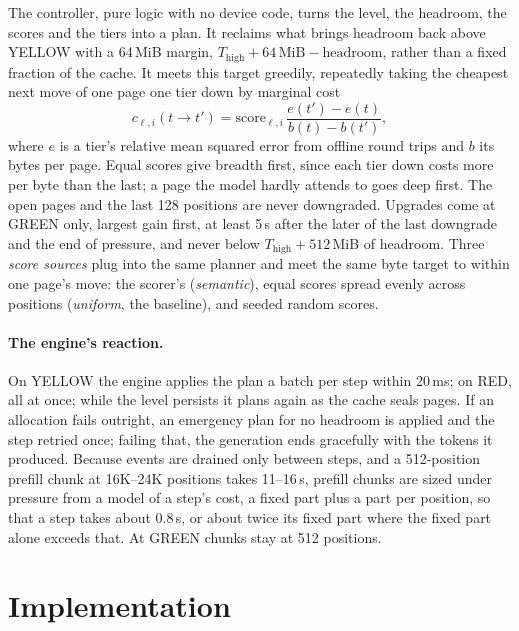 \documentclass{article}
\begin{document}
The controller, pure logic with no device code, turns the level, the headroom,
the scores and the tiers into a plan. It reclaims what brings headroom back
above YELLOW with a 64\,MiB margin, $T_\mathrm{high} + 64\,\mathrm{MiB} -
\text{headroom}$, rather than a fixed fraction of the cache. It meets this
target greedily, repeatedly taking the cheapest next move of one page one tier
down by marginal cost
\begin{equation}
  c_{\ell,i}(t \to t') = \mathrm{score}_{\ell,i}\,
    \frac{e(t') - e(t)}{b(t) - b(t')},
  \label{eq:marginal}
\end{equation}
where $e$ is a tier's relative mean squared error from offline round trips and
$b$ its bytes per page. Equal scores give breadth first, since each tier down
costs more per byte than the last; a page the model hardly attends to goes deep
first. The open pages and the last 128 positions are never downgraded.
Upgrades come at GREEN only, largest gain first, at least 5\,s after the later
of the last downgrade and the end of pressure, and never below $T_\mathrm{high}
+ 512$\,MiB of headroom. Three \textit{score sources} plug into the same
planner and meet the same byte target to within one page's move: the scorer's
(\textit{semantic}), equal scores spread evenly across positions
(\textit{uniform}, the baseline), and seeded random scores.

\paragraph{The engine's reaction.} On YELLOW the engine applies the plan a
batch per step within 20\,ms; on RED, all at once; while the level persists it
plans again as the cache seals pages. If an allocation fails outright, an
emergency plan for no headroom is applied and the step retried once; failing
that, the generation ends gracefully with the tokens it produced. Because events
are drained only between steps, and a 512-position prefill chunk at 16K--24K
positions takes 11--16\,s, prefill chunks are sized under pressure from a model
of a step's cost, a fixed part plus a part per position, so that a step takes
about 0.8\,s, or about twice its fixed part where the fixed part alone exceeds
that. At GREEN chunks stay at 512 positions.

\section{Implementation}
\label{sec:implementation}
\end{document}
